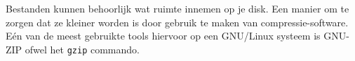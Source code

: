 Bestanden kunnen behoorlijk wat ruimte innemen op je disk. Een manier om te zorgen dat ze kleiner worden is door gebruik te maken van compressie-software. E\'en van de meest gebruikte tools hiervoor op een GNU/Linux systeem is GNU-ZIP ofwel het \texttt{gzip} commando.

